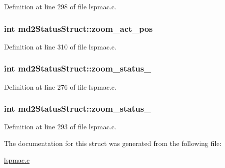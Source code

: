 Definition at line 298 of file lspmac.\-c.

\hypertarget{structmd2StatusStruct_a920b80e9f5f08aedac3ad541d5ffc8ae}{
\subsubsection[{zoom\-\_\-act\-\_\-pos}]{\setlength{\rightskip}{0pt plus 5cm}int md2\-Status\-Struct\-::zoom\-\_\-act\-\_\-pos}}\label{structmd2StatusStruct_a920b80e9f5f08aedac3ad541d5ffc8ae}


Definition at line 310 of file lspmac.\-c.

\hypertarget{structmd2StatusStruct_af28e978b761dc07eefed3971547cfd4d}{
\subsubsection[{zoom\-\_\-status\-\_\-1}]{\setlength{\rightskip}{0pt plus 5cm}int md2\-Status\-Struct\-::zoom\-\_\-status\-\_}}\label{structmd2StatusStruct_af28e978b761dc07eefed3971547cfd4d}


Definition at line 276 of file lspmac.\-c.

\hypertarget{structmd2StatusStruct_a34e4200315a083deb8a970e21bbbe277}{
\subsubsection[{zoom\-\_\-status\-\_\-2}]{\setlength{\rightskip}{0pt plus 5cm}int md2\-Status\-Struct\-::zoom\-\_\-status\-\_}}\label{structmd2StatusStruct_a34e4200315a083deb8a970e21bbbe277}


Definition at line 293 of file lspmac.\-c.



The documentation for this struct was generated from the following file\-:\begin{DoxyCompactItemize}
\item 
\hyperlink{lspmac_8c}{lspmac.\-c}\end{DoxyCompactItemize}
